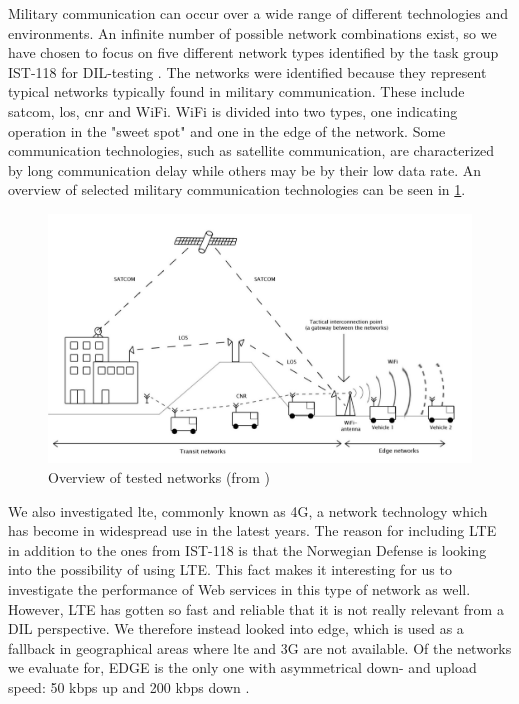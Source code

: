 Military communication can occur over a wide range of different technologies and
environments. An infinite number of possible network combinations exist, so we
have chosen to focus on five different network types identified by the task
group IST-118 for DIL-testing \cite{johnsen-recommendations}. The networks were
identified because they represent typical networks typically found in military
communication.  These include \gls{satcom}, \gls{los}, \gls{cnr} and WiFi. WiFi
is divided into two types, one indicating operation in the "sweet spot" and one
in the edge of the network. Some communication technologies, such as satellite
communication, are characterized by long communication delay while others may be
by their low data rate. An overview of selected military communication
technologies can be seen in \cref{figure-networks-overview}.

\begin{figure}[h]
\includegraphics[width=\textwidth]{images/networks_overview.pdf}
\caption{Overview of tested networks (from \cite{krog-pisa})}
\label{figure-networks-overview}
\end{figure}

We also investigated \gls{lte}, commonly known as 4G, a network technology which
has become in widespread use in the latest years. The reason for including LTE
in addition to the ones from IST-118 is that the Norwegian Defense is looking
into the possibility of using LTE. This fact makes it interesting for us to
investigate the performance of Web services in this type of network as well.
However, LTE has gotten so fast and reliable that it is not really relevant from
a DIL perspective. We therefore instead looked into \gls{edge}, which is used as
a fallback in geographical areas where \gls{lte} and 3G are not available. Of
the networks we evaluate for, EDGE is the only one with asymmetrical down- and
upload speed: 50 kbps up and 200 kbps down
\cite{evaluation-transport-protocols-web-services}.

